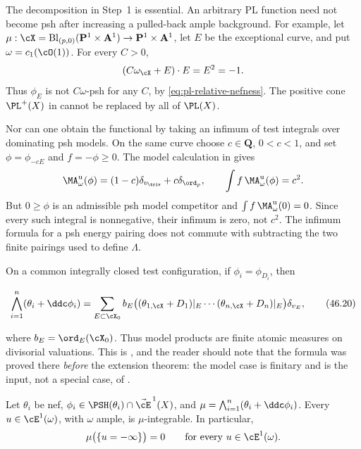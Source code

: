 \begin{remark}
\label{rem:ch46-zeroth-slot}
The decomposition in Step~1 is essential.  An arbitrary PL function
need not become psh after increasing a pulled-back ample background.
For example, let
$\mu:\cX=\operatorname{Bl}_{(p,0)}(\mathbf P^1\times\mathbf A^1)
\to\mathbf P^1\times\mathbf A^1$, let $E$ be the exceptional curve,
and put $\omega=c_1(\cO(1))$.  For every $C>0$,
\[
 (C\omega_{\cX}+E)\cdot E=E^2=-1.
\]
Thus $\phi_E$ is not $C\omega$-psh for any $C$, by
\eqref{eq:pl-relative-nefness}.  The positive cone $\PL^+(X)$ in
 cannot be replaced by all of $\PL(X)$.

Nor can one obtain the functional by taking an infimum of test
integrals over dominating psh models.  On the same curve choose
$c\in\mathbf Q$, $0<c<1$, and set $\phi=\phi_{-cE}$ and $f=-\phi\geq0$.
The model calculation in  gives
\[
 \MA^{\mathrm u}_\omega(\phi)
     =(1-c)\delta_{v_{\triv}}+c\delta_{\ord_p},
 \qquad
 \int f\,\MA^{\mathrm u}_\omega(\phi)=c^2.
\]
But $0\geq\phi$ is an admissible psh model competitor and
$\int f\,\MA^{\mathrm u}_\omega(0)=0$.  Since every such integral is
nonnegative, their infimum is zero, not $c^2$.
The infimum formula for a psh energy pairing does not commute with
subtracting the two finite pairings used to define $\Lambda$.
\end{remark}

On a common integrally closed test configuration, if
$\phi_i=\phi_{D_i}$, then

\[
 \bigwedge_{i=1}^n(\theta_i+\ddc\phi_i)
   =\sum_{E\subset\cX_0}
      b_E\bigl((\theta_{1,\cX}+D_1)|_E\cdots
               (\theta_{n,\cX}+D_n)|_E\bigr)\delta_{v_E},
\tag{46.20}\label{eq:bj-model-ma-atomic}
\]

where $b_E=\ord_E(\cX_0)$.  Thus model products are finite atomic
measures on divisorial valuations.  This is
, and the reader should note that the formula
was proved there \emph{before} the extension theorem: the model case is
finitary and is the input, not a special case, of
.

\begin{proposition}
\label{prop:ch46-no-mass-outside-lin}
Let $\theta_i$ be nef,
$\phi_i\in\PSH(\theta_i)\cap\vec{\cE}^{\,1}(X)$, and
$\mu=\bigwedge_{i=1}^n(\theta_i+\ddc\phi_i)$.
Every $u\in\cE^1(\omega)$, with $\omega$ ample, is $\mu$-integrable.
In particular,
\[
 \mu\bigl(\{u=-\infty\}\bigr)=0
 \qquad\text{for every }u\in\cE^1(\omega).
\]
\end{proposition}

